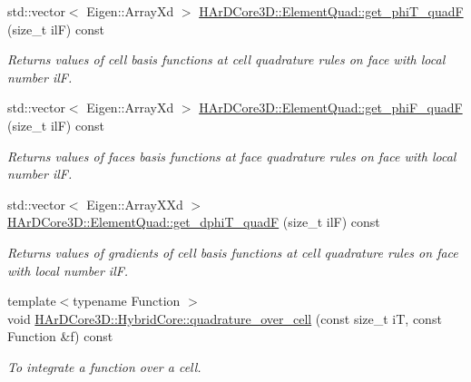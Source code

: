 \begin{DoxyCompactItemize}
\mbox{\label{group__HybridCore_gab6349fe3a8eb0d4070cd2bd82742bdcc}} 
std\+::vector$<$ Eigen\+::\+Array\+Xd $>$ \hyperlink{group__HybridCore_gab6349fe3a8eb0d4070cd2bd82742bdcc}{H\+Ar\+D\+Core3\+D\+::\+Element\+Quad\+::get\+\_\+phi\+T\+\_\+quadF} (size\+\_\+t ilF) const
\begin{DoxyCompactList}\small\item\em Returns values of cell basis functions at cell quadrature rules on face with local number ilF. \end{DoxyCompactList}\item 
\mbox{\label{group__HybridCore_gad9c2ba4cdbfda183ee00ab059d8885e5}} 
std\+::vector$<$ Eigen\+::\+Array\+Xd $>$ \hyperlink{group__HybridCore_gad9c2ba4cdbfda183ee00ab059d8885e5}{H\+Ar\+D\+Core3\+D\+::\+Element\+Quad\+::get\+\_\+phi\+F\+\_\+quadF} (size\+\_\+t ilF) const
\begin{DoxyCompactList}\small\item\em Returns values of faces basis functions at face quadrature rules on face with local number ilF. \end{DoxyCompactList}\item 
\mbox{\label{group__HybridCore_gabae2f4323f94acb5417ca82870790071}} 
std\+::vector$<$ Eigen\+::\+Array\+X\+Xd $>$ \hyperlink{group__HybridCore_gabae2f4323f94acb5417ca82870790071}{H\+Ar\+D\+Core3\+D\+::\+Element\+Quad\+::get\+\_\+dphi\+T\+\_\+quadF} (size\+\_\+t ilF) const
\begin{DoxyCompactList}\small\item\em Returns values of gradients of cell basis functions at cell quadrature rules on face with local number ilF. \end{DoxyCompactList}\item 
\mbox{\label{group__HybridCore_gaca6e3380063a17fcb76276bc8c503d5b}} 
{\footnotesize template$<$typename Function $>$ }\\void \hyperlink{group__HybridCore_gaca6e3380063a17fcb76276bc8c503d5b}{H\+Ar\+D\+Core3\+D\+::\+Hybrid\+Core\+::quadrature\+\_\+over\+\_\+cell} (const size\+\_\+t iT, const Function \&f) const
\begin{DoxyCompactList}\small\item\em To integrate a function over a cell. \end{DoxyCompactList}\item 

\end{DoxyCompactItemize}
